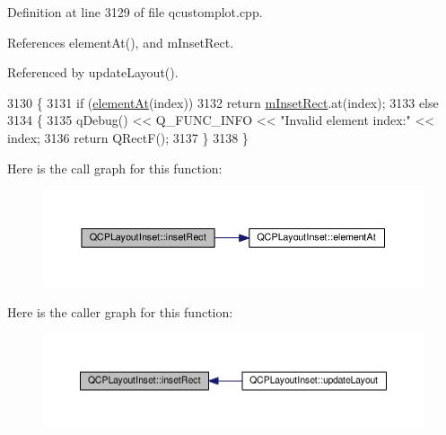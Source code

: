 Definition at line 3129 of file qcustomplot.\+cpp.



References element\+At(), and m\+Inset\+Rect.



Referenced by update\+Layout().


\begin{DoxyCode}
3130 \{
3131   \textcolor{keywordflow}{if} (\hyperlink{class_q_c_p_layout_inset_ab096d07b08f9b5455647f3ba7ff60e27}{elementAt}(index))
3132     \textcolor{keywordflow}{return} \hyperlink{class_q_c_p_layout_inset_aaa8f6b5029458f3d97a65239524a2b33}{mInsetRect}.at(index);
3133   \textcolor{keywordflow}{else}
3134   \{
3135     qDebug() << Q\_FUNC\_INFO << \textcolor{stringliteral}{"Invalid element index:"} << index;
3136     \textcolor{keywordflow}{return} QRectF();
3137   \}
3138 \}
\end{DoxyCode}


Here is the call graph for this function\+:\nopagebreak
\begin{figure}[H]
\begin{center}
\leavevmode
\includegraphics[width=350pt]{class_q_c_p_layout_inset_a5ec7037b3b8d20fbf9560e01779b1442_cgraph}
\end{center}
\end{figure}




Here is the caller graph for this function\+:\nopagebreak
\begin{figure}[H]
\begin{center}
\leavevmode
\includegraphics[width=350pt]{class_q_c_p_layout_inset_a5ec7037b3b8d20fbf9560e01779b1442_icgraph}
\end{center}
\end{figure}


\hypertarget{class_q_c_p_layout_inset_ab5a2f2b88c05e369fd7da9583d17aa3a}{}
